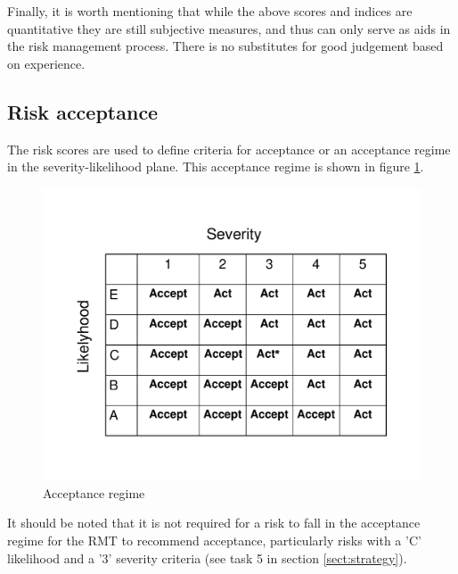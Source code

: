 Finally, it is worth mentioning that while the above scores and indices are quantitative they are still subjective measures, and thus can only serve as aids in the risk management process. There is no substitutes for good judgement based on experience.

\subsection{Risk acceptance \label{sect:acceptance}}

The risk scores are used to define criteria for acceptance or an acceptance regime in the severity-likelihood plane. This acceptance regime is shown in figure \ref{fig:regime}.

  \begin{figure}[H]
  \begin{center}
  	\includegraphics[scale=0.5]{images/AcceptanceRegime}
  \end{center}
\vspace{-2cm}
\caption{Acceptance regime \label{fig:regime}}
   \end{figure}

It should be noted that it is not required for a risk to fall in the acceptance regime for the RMT to recommend acceptance, particularly risks with a 'C' likelihood and a '3' severity criteria (see task 5 in section \ref{sect:strategy}).
